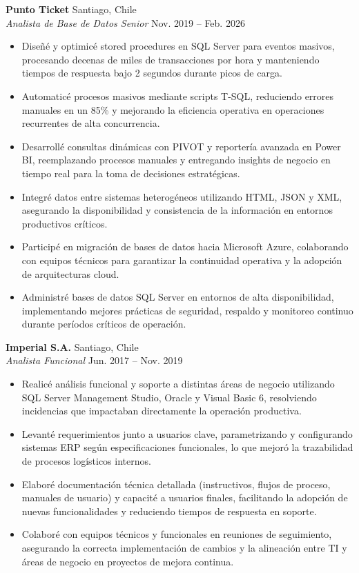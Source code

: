 \documentclass[11pt,letterpaper]{article}
\begin{document}
\textbf{Punto Ticket} \hfill Santiago, Chile\\
\textit{Analista de Base de Datos Senior} \hfill Nov. 2019 – Feb. 2026
\begin{itemize}
  \item Diseñé y optimicé stored procedures en SQL Server para eventos masivos, procesando decenas de miles de transacciones por hora y manteniendo tiempos de respuesta bajo 2 segundos durante picos de carga.
  \item Automaticé procesos masivos mediante scripts T-SQL, reduciendo errores manuales en un 85\% y mejorando la eficiencia operativa en operaciones recurrentes de alta concurrencia.
  \item Desarrollé consultas dinámicas con PIVOT y reportería avanzada en Power BI, reemplazando procesos manuales y entregando insights de negocio en tiempo real para la toma de decisiones estratégicas.
  \item Integré datos entre sistemas heterogéneos utilizando HTML, JSON y XML, asegurando la disponibilidad y consistencia de la información en entornos productivos críticos.
  \item Participé en migración de bases de datos hacia Microsoft Azure, colaborando con equipos técnicos para garantizar la continuidad operativa y la adopción de arquitecturas cloud.
  \item Administré bases de datos SQL Server en entornos de alta disponibilidad, implementando mejores prácticas de seguridad, respaldo y monitoreo continuo durante períodos críticos de operación.
\end{itemize}
\vspace{2pt}
\textbf{Imperial S.A.} \hfill Santiago, Chile\\
\textit{Analista Funcional} \hfill Jun. 2017 – Nov. 2019
\begin{itemize}
  \item Realicé análisis funcional y soporte a distintas áreas de negocio utilizando SQL Server Management Studio, Oracle y Visual Basic 6, resolviendo incidencias que impactaban directamente la operación productiva.
  \item Levanté requerimientos junto a usuarios clave, parametrizando y configurando sistemas ERP según especificaciones funcionales, lo que mejoró la trazabilidad de procesos logísticos internos.
  \item Elaboré documentación técnica detallada (instructivos, flujos de proceso, manuales de usuario) y capacité a usuarios finales, facilitando la adopción de nuevas funcionalidades y reduciendo tiempos de respuesta en soporte.
  \item Colaboré con equipos técnicos y funcionales en reuniones de seguimiento, asegurando la correcta implementación de cambios y la alineación entre TI y áreas de negocio en proyectos de mejora continua.
\end{itemize}
\end{document}
